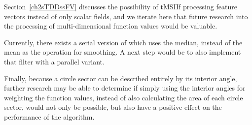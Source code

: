 Section~\ref{ch2sTDDssFV} discusses the possibility of \gls{tMSIIf} processing feature vectors instead of only scalar fields, and we iterate here that future research into the processing of multi-dimensional function values would be valuable.

Currently, there exists a serial version of  which uses the median, instead of the mean as the operation for smoothing. A next step would be to also implement that filter with a parallel variant.

Finally, because a circle sector can be described entirely by its interior angle, further research may be able to determine if simply using the interior angles for weighting the function values, instead of also calculating the area of each circle sector, would not only be possible, but also have a positive effect on the performance of the algorithm.
